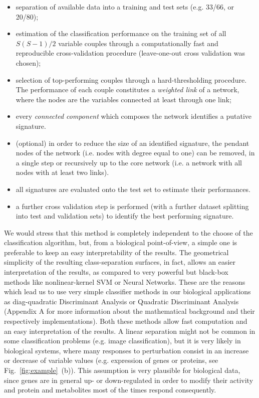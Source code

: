 \documentclass{standalone}
\begin{document}
\begin{itemize}

\item separation of available data into a training and test sets (e.g. 33/66, or 20/80);

\item estimation of the classification performance on the training set of all $S(S-1)/2$ variable couples through a computationally fast and reproducible cross-validation procedure (leave-one-out cross validation was chosen);

\item selection of top-performing couples through a hard-thresholding procedure.
The performance of each couple constitutes a \emph{weighted link} of a network, where the nodes are the variables connected at least through one link;

\item every \emph{connected component} which composes the network identifies a putative signature.

\item (optional) in order to reduce the size of an identified signature, the pendant nodes of the network (i.e. nodes with degree equal to one) can be removed, in a single step or recursively up to the core network (i.e. a network with all nodes with at least two links).

\item all signatures are evaluated onto the test set to estimate their performances.

\item a further cross validation step is performed (with a further dataset splitting into test and validation sets) to identify the best performing signature.

\end{itemize}

We would stress that this method is completely independent to the choose of the classification algorithm, but, from a biological point-of-view, a simple one is preferable to keep an easy interpretability of the results.
The geometrical simplicity of the resulting class-separation surfaces, in fact, allows an easier interpretation of the results, as compared to very powerful but black-box methods like nonlinear-kernel SVM or Neural Networks.
These are the reasons which lead us to use very simple classifier methods in our biological applications as diag-quadratic Discriminant Analysis or Quadratic Discriminant Analysis (Appendix A for more information about the mathematical background and their respectively implementations).
Both these methods allow fast computation and an easy interpretation of the results.
A linear separation might not be common in some classification problems (e.g. image classification), but it is very likely in biological systems, where many responses to perturbation consist in an increase or decrease of variable values (e.g. expression of genes or proteins, see Fig.~\ref{fig:example}~(b)).
This assumption is very plausible for biological data, since genes are in general up- or down-regulated in order to modify their activity and protein and metabolites most of the times respond consequently.
\end{document}
